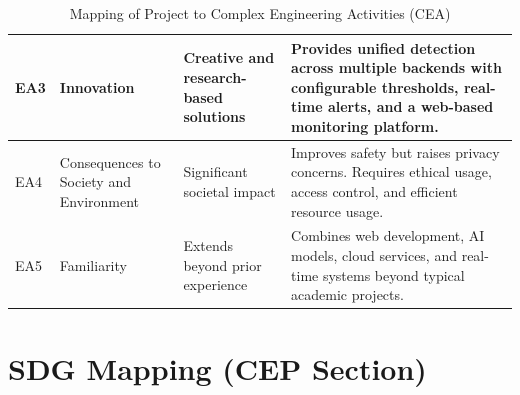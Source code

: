 \documentclass[10pt,openany]{report}
\begin{document}
\begin{sloppypar}
{{{\begin{sloppypar}
\begin{table}[H]
{\begin{tabular}{|p{1.2cm}|p{3cm}|p{4cm}|p{6.5cm}|}
EA3 & Innovation &
Creative and research-based solutions &
Provides unified detection across multiple backends with configurable thresholds, real-time alerts, and a web-based monitoring platform. \\
\hline

EA4 & Consequences to Society and Environment &
Significant societal impact &
Improves safety but raises privacy concerns. Requires ethical usage, access control, and efficient resource usage. \\
\hline

EA5 & Familiarity &
Extends beyond prior experience &
Combines web development, AI models, cloud services, and real-time systems beyond typical academic projects. \\
\hline

\end{tabular}%
}
\caption{Mapping of Project to Complex Engineering Activities (CEA)}
\label{tab:cea_mapping}

\end{table}
\section{SDG Mapping (CEP Section)}


\end{sloppypar}}}}
\end{sloppypar}
\end{document}
